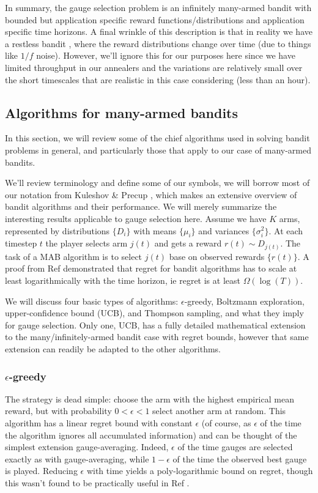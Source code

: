 In summary, the gauge selection problem is an infinitely many-armed bandit with bounded but application specific reward functions/distributions and application specific time horizons. A final wrinkle of this description is that in reality we have a restless bandit \cite{whittle1988restless}, where the reward distributions change over time (due to things like $1/f$ noise). However, we'll ignore this for our purposes here since we have limited throughput in our annealers and the variations are relatively small over the short timescales that are realistic in this case considering (less than an hour).

\subsection{Algorithms for many-armed bandits}
In this section, we will review some of the chief algorithms used in solving bandit problems in general, and particularly those that apply to our case of many-armed bandits.

We'll review terminology and define some of our symbols, we will borrow most of our notation from Kuleshov \& Precup \cite{banditalgorithms}, which makes an extensive overview of bandit algorithms and their performance. We will merely summarize the interesting results applicable to gauge selection here. Assume we have $K$ arms, represented by distributions $\{D_i\}$ with means $\{\mu_i\}$ and variances $\{\sigma_i^2\}$. At each timestep $t$ the player selects arm $j(t)$ and gets a reward $r(t)\sim D_{j(t)}$. The task of a MAB algorithm is to select $j(t)$ base on observed rewards $\{r(t)\}$. A proof from Ref \cite{lai1985asymptotically} demonstrated that regret for bandit algorithms has to scale at least logarithmically with the time horizon, ie regret is at least $\Omega(\log(T))$.

We will discuss four basic types of algorithms: $\epsilon$-greedy, Boltzmann exploration, upper-confidence bound (UCB), and Thompson sampling, and what they imply for gauge selection. Only one, UCB, has a fully detailed mathematical extension to the many/infinitely-armed bandit case with regret bounds, however that same extension can readily be adapted to the other algorithms.

\subsubsection{$\epsilon$-greedy}
The \eg strategy is dead simple: choose the arm with the highest empirical mean reward, but with probability $0<\epsilon<1$ select another arm at random. This algorithm has a linear regret bound with constant $\epsilon$ (of course, as $\epsilon$ of the time the algorithm ignores all accumulated information) and can be thought of the simplest extension gauge-averaging. Indeed, $\epsilon$ of the time gauges are selected exactly as with gauge-averaging, while $1-\epsilon$ of the time the observed best gauge is played. Reducing $\epsilon$ with time yields a poly-logarithmic bound on regret, though this wasn't found to be practically useful in Ref \cite{vermorel2005multi}. %

